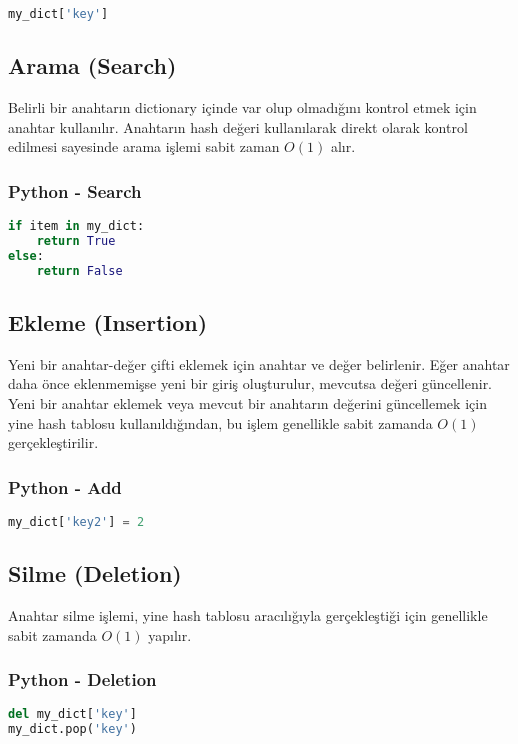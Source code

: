 \begin{lstlisting}[language=Python]
my_dict['key']
\end{lstlisting}

\subsection{Arama (Search)}

Belirli bir anahtarın dictionary içinde var olup olmadığını kontrol etmek için anahtar kullanılır. Anahtarın hash değeri kullanılarak direkt olarak kontrol edilmesi sayesinde arama işlemi sabit zaman $O(1)$ alır.

\subsubsection{Python - Search}

\begin{lstlisting}[language=Python]
if item in my_dict:
    return True
else:
    return False
\end{lstlisting}

\subsection{Ekleme (Insertion)}

Yeni bir anahtar-değer çifti eklemek için anahtar ve değer belirlenir. Eğer anahtar daha önce eklenmemişse yeni bir giriş oluşturulur, mevcutsa değeri güncellenir. Yeni bir anahtar eklemek veya mevcut bir anahtarın değerini güncellemek için yine hash tablosu kullanıldığından, bu işlem genellikle sabit zamanda $O(1)$ gerçekleştirilir.

\subsubsection{Python - Add}

\begin{lstlisting}[language=Python]
my_dict['key2'] = 2
\end{lstlisting}

\subsection{Silme (Deletion)}

Anahtar silme işlemi, yine hash tablosu aracılığıyla gerçekleştiği için genellikle sabit zamanda $O(1)$ yapılır.

\subsubsection{Python - Deletion}

\begin{lstlisting}[language=Python]
del my_dict['key']
my_dict.pop('key')
\end{lstlisting}

\newpage